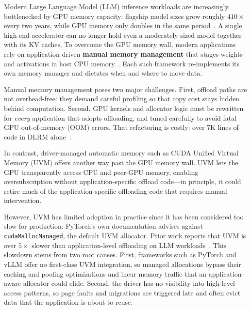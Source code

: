 
Modern Large Language Model (LLM) inference workloads
    are increasingly bottlenecked by GPU memory capacity:
    flagship model sizes grow roughly $410\times$ every two years,
    while GPU memory only doubles in the same period~\cite{ai-memory-wall}.
A single high-end accelerator can no longer hold even a moderately sized model
    together with its KV caches.
To overcome the GPU memory wall,
    modern applications rely on application-driven \textbf{manual memory management} that
    stages weights and activations in host CPU memory~\cite{flexgen, infinigen, headinfer, vllm}.
Each such framework re-implements its own memory manager
    and dictates when and where to move data.

Manual memory management poses two major challenges.
First, offload paths are not overhead-free:
    they demand careful profiling so that copy cost stays hidden behind computation.
Second, GPU kernels and allocator logic must be rewritten for
    \emph{every} application that adopts offloading,
    and tuned carefully to avoid fatal GPU out-of-memory (OOM) errors.
That refactoring is costly: over 7K lines of code in DLRM alone~\cite{fbgemm_tbe_training_docs}.


In contrast, driver-managed automatic memory such as CUDA Unified Virtual Memory (UVM)
    offers another way past the GPU memory wall.
UVM lets the GPU transparently access CPU and peer-GPU memory,
    enabling oversubscription without application-specific offload code---in principle,
    it could retire much of the application-specific offloading code that requires manual intervention.

However, UVM has limited adoption in practice
    since it has been considered too slow for production:
    PyTorch's own documentation advises against \texttt{cudaMallocManaged},
    the default UVM allocator.
Prior work reports that UVM is over $5\times$ slower than
    application-level offloading on LLM workloads~\cite{infinigen}.
This slowdown stems from two root causes.
First, frameworks such as PyTorch and vLLM
    offer no first-class UVM integration,
    so managed allocations bypass their caching and pooling optimizations
    and incur memory traffic that an application-aware allocator could elide.
Second, the driver has no visibility into high-level access patterns,
    so page faults and migrations are triggered late and often evict data
    that the application is about to reuse.

